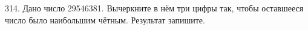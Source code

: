 314. Дано число 29546381. Вычеркните в нём три цифры так, чтобы оставшееся число было наибольшим чётным. Результат запишите.\\
